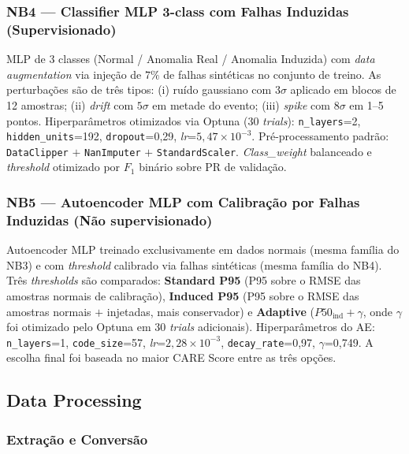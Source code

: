 \documentclass[12pt]{article}
\begin{document}
\subsubsection{NB4 --- Classifier MLP 3-class com Falhas Induzidas (Supervisionado)}

MLP de 3 classes (Normal / Anomalia Real / Anomalia Induzida) com \textit{data augmentation} via injeção de $7\%$ de falhas sintéticas no conjunto de treino. As perturbações são de três tipos: (i) ruído gaussiano com $3\sigma$ aplicado em blocos de 12 amostras; (ii) \textit{drift} com $5\sigma$ em metade do evento; (iii) \textit{spike} com $8\sigma$ em 1--5 pontos. Hiperparâmetros otimizados via Optuna (30 \textit{trials}): \texttt{n\_layers}=2, \texttt{hidden\_units}=192, \texttt{dropout}=0,29, \textit{lr}=$5{,}47 \times 10^{-3}$. Pré-processamento padrão: \texttt{DataClipper} $+$ \texttt{NanImputer} $+$ \texttt{StandardScaler}. \textit{Class\_weight} balanceado e \textit{threshold} otimizado por $F_1$ binário sobre PR de validação.

\subsubsection{NB5 --- Autoencoder MLP com Calibração por Falhas Induzidas (Não supervisionado)}

Autoencoder MLP treinado exclusivamente em dados normais (mesma família do NB3) e com \textit{threshold} calibrado via falhas sintéticas (mesma família do NB4). Três \textit{thresholds} são comparados: \textbf{Standard P95} (P95 sobre o RMSE das amostras normais de calibração), \textbf{Induced P95} (P95 sobre o RMSE das amostras normais $+$ injetadas, mais conservador) e \textbf{Adaptive} ($P50_{\mathrm{ind}} + \gamma$, onde $\gamma$ foi otimizado pelo Optuna em 30 \textit{trials} adicionais). Hiperparâmetros do AE: \texttt{n\_layers}=1, \texttt{code\_size}=57, \textit{lr}=$2{,}28 \times 10^{-3}$, \texttt{decay\_rate}=0,97, $\gamma$=0,749. A escolha final foi baseada no maior CARE Score entre as três opções.

\subsection{Data Processing}\label{subsec:tratamento_dados}

\subsubsection{Extração e Conversão}
\end{document}
